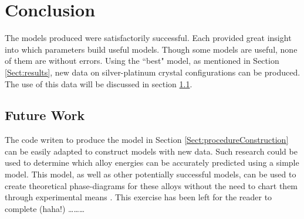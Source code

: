 \section{Conclusion}\label{Sect:conclusion}
\par The models produced were satisfactorily successful. Each provided great insight into which parameters build useful models. Though some models are useful, none of them are without errors. Using the ``best" model, as mentioned in Section \ref{Sect:results}, new data on silver-platinum crystal configurations can be produced. The use of this data will be discussed in section \ref{Sect:futureWork}.

\subsection{Future Work}\label{Sect:futureWork}
\par The code writen to produce the model in Section \ref{Sect:procedureConstruction} can be easily adapted to construct models with new data. Such research could be used to determine which alloy energies can be accurately predicted using a simple model. This model, as well as other potentially successful models, can be used to create theoretical phase-diagrams for these alloys without the need to chart them through experimental means \cite{solidStateBook} \cite{testing}. This exercise has been left for the reader to complete (haha!) \ldots\ldots\ldots